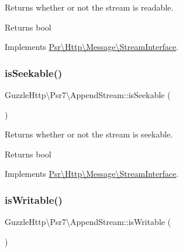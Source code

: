Returns whether or not the stream is readable.

\begin{DoxyReturn}{Returns}
bool 
\end{DoxyReturn}


Implements \hyperlink{interfacePsr_1_1Http_1_1Message_1_1StreamInterface_aecf78407aa241622ae200a9faa471d32}{Psr\textbackslash{}\+Http\textbackslash{}\+Message\textbackslash{}\+Stream\+Interface}.

\mbox{\label{classGuzzleHttp_1_1Psr7_1_1AppendStream_abca8060e94e6c266fb987ae52c9119a2}} 
\subsubsection{\texorpdfstring{is\+Seekable()}{isSeekable()}}
{\footnotesize\ttfamily Guzzle\+Http\textbackslash{}\+Psr7\textbackslash{}\+Append\+Stream\+::is\+Seekable (\begin{DoxyParamCaption}{ }\end{DoxyParamCaption})}

Returns whether or not the stream is seekable.

\begin{DoxyReturn}{Returns}
bool 
\end{DoxyReturn}


Implements \hyperlink{interfacePsr_1_1Http_1_1Message_1_1StreamInterface_ad4a27548fd51bd12390d798981a1622b}{Psr\textbackslash{}\+Http\textbackslash{}\+Message\textbackslash{}\+Stream\+Interface}.

\mbox{\label{classGuzzleHttp_1_1Psr7_1_1AppendStream_af63f6bfc1c273407b55b82ad6e4b9e74}} 
\subsubsection{\texorpdfstring{is\+Writable()}{isWritable()}}
{\footnotesize\ttfamily Guzzle\+Http\textbackslash{}\+Psr7\textbackslash{}\+Append\+Stream\+::is\+Writable (\begin{DoxyParamCaption}{ }\end{DoxyParamCaption})}

